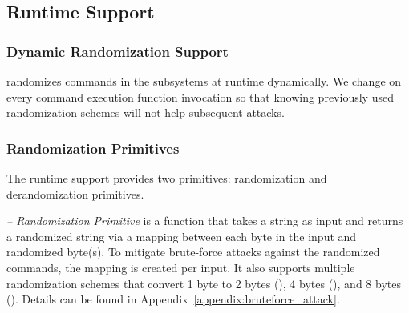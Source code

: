 

\subsection{\sysname Runtime Support}
\label{subsec:runtimesupport}

\subsubsection{Dynamic Randomization Support}
\sysname randomizes commands in the subsystems at runtime dynamically. We change  on every command execution function invocation  so that knowing previously used randomization schemes will not help subsequent attacks.


\subsubsection{Randomization Primitives}
The runtime support provides two primitives: randomization and derandomization primitives.

\noindent
{\it -- Randomization Primitive} is a function that takes a string as input and returns a randomized string via a mapping between each byte in the input and randomized byte(s). 
To mitigate brute-force attacks against the randomized commands, the mapping is created per input. 
It also supports multiple randomization schemes that convert 1 byte to 2 bytes (), 4 bytes (), and 8 bytes ().
Details can be found in Appendix~\ref{appendix:bruteforce_attack}.

